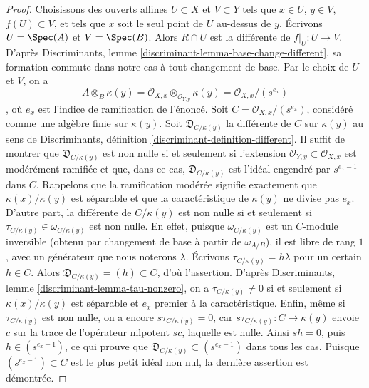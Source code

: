 \begin{proof}
\medskip\noindent
Choisissons des ouverts affines $U \subset X$ et $V \subset Y$ tels que $x \in U$, $y \in V$, $f(U) \subset V$, et tels que $x$ soit le seul point de $U$ au-dessus de $y$. Écrivons $U = \Spec(A)$ et $V = \Spec(B)$. Alors $R \cap U$ est la différente de $f|_U : U \to V$. D'après Discriminants, lemme \ref{discriminant-lemma-base-change-different}, sa formation commute dans notre cas à tout changement de base. Par le choix de $U$ et $V$, on a $$
A \otimes_B \kappa(y) =
\mathcal{O}_{X, x} \otimes_{\mathcal{O}_{Y, y}} \kappa(y) =
\mathcal{O}_{X, x}/(s^{e_x})
$$, où $e_x$ est l'indice de ramification de l'énoncé. Soit $C = \mathcal{O}_{X, x}/(s^{e_x})$, considéré comme une algèbre finie sur $\kappa(y)$. Soit $\mathfrak{D}_{C/\kappa(y)}$ la différente de $C$ sur $\kappa(y)$ au sens de Discriminants, définition \ref{discriminant-definition-different}. Il suffit de montrer que $\mathfrak{D}_{C/\kappa(y)}$ est non nulle si et seulement si l'extension $\mathcal{O}_{Y, y} \subset \mathcal{O}_{X, x}$ est modérément ramifiée et que, dans ce cas, $\mathfrak{D}_{C/\kappa(y)}$ est l'idéal engendré par $s^{e_x - 1}$ dans $C$. Rappelons que la ramification modérée signifie exactement que $\kappa(x)/\kappa(y)$ est séparable et que la caractéristique de $\kappa(y)$ ne divise pas $e_x$. D'autre part, la différente de $C/\kappa(y)$ est non nulle si et seulement si $\tau_{C/\kappa(y)} \in \omega_{C/\kappa(y)}$ est non nulle. En effet, puisque $\omega_{C/\kappa(y)}$ est un $C$-module inversible (obtenu par changement de base à partir de $\omega_{A/B}$), il est libre de rang $1$, avec un générateur que nous noterons $\lambda$. Écrivons $\tau_{C/\kappa(y)} = h\lambda$ pour un certain $h \in C$. Alors $\mathfrak{D}_{C/\kappa(y)} = (h) \subset C$, d'où l'assertion. D'après Discriminants, lemme \ref{discriminant-lemma-tau-nonzero}, on a $\tau_{C/\kappa(y)} \not = 0$ si et seulement si $\kappa(x)/\kappa(y)$ est séparable et $e_x$ premier à la caractéristique. Enfin, même si $\tau_{C/\kappa(y)}$ est non nulle, on a encore $s \tau_{C/\kappa(y)} = 0$, car $s\tau_{C/\kappa(y)} : C \to \kappa(y)$ envoie $c$ sur la trace de l'opérateur nilpotent $sc$, laquelle est nulle. Ainsi $sh = 0$, puis $h \in (s^{e_x - 1})$, ce qui prouve que $\mathfrak{D}_{C/\kappa(y)} \subset (s^{e_x - 1})$ dans tous les cas. Puisque $(s^{e_x - 1}) \subset C$ est le plus petit idéal non nul, la dernière assertion est démontrée.
\end{proof}






